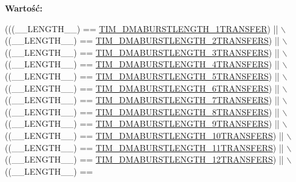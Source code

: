 {\bfseries Wartość\+:}
\begin{DoxyCode}
(((\_\_LENGTH\_\_) == \hyperlink{group___t_i_m___d_m_a___burst___length_ga74f07b4a10022d71f31ec6e1b2b69276}{TIM\_DMABURSTLENGTH\_1TRANSFER}) || \(\backslash\)
                                            ((\_\_LENGTH\_\_) == 
      \hyperlink{group___t_i_m___d_m_a___burst___length_gab114592091a00e0a6b9ae464485bd7bb}{TIM\_DMABURSTLENGTH\_2TRANSFERS}) || \(\backslash\)
                                            ((\_\_LENGTH\_\_) == 
      \hyperlink{group___t_i_m___d_m_a___burst___length_gad91c14f0930803593ecdbd98002fea0a}{TIM\_DMABURSTLENGTH\_3TRANSFERS}) || \(\backslash\)
                                            ((\_\_LENGTH\_\_) == 
      \hyperlink{group___t_i_m___d_m_a___burst___length_ga9ada9605ae6ff6e4ada9701263bef812}{TIM\_DMABURSTLENGTH\_4TRANSFERS}) || \(\backslash\)
                                            ((\_\_LENGTH\_\_) == 
      \hyperlink{group___t_i_m___d_m_a___burst___length_ga740a6446c0a517cc3e235fddee45fef5}{TIM\_DMABURSTLENGTH\_5TRANSFERS}) || \(\backslash\)
                                            ((\_\_LENGTH\_\_) == 
      \hyperlink{group___t_i_m___d_m_a___burst___length_ga905c206d2a028e3fb92bcab8f9f7c869}{TIM\_DMABURSTLENGTH\_6TRANSFERS}) || \(\backslash\)
                                            ((\_\_LENGTH\_\_) == 
      \hyperlink{group___t_i_m___d_m_a___burst___length_gae75055ac13b73baf9326f1d6157853a7}{TIM\_DMABURSTLENGTH\_7TRANSFERS}) || \(\backslash\)
                                            ((\_\_LENGTH\_\_) == 
      \hyperlink{group___t_i_m___d_m_a___burst___length_gac6b24f5b7d9e1968b4bfcaeb24e718fc}{TIM\_DMABURSTLENGTH\_8TRANSFERS}) || \(\backslash\)
                                            ((\_\_LENGTH\_\_) == 
      \hyperlink{group___t_i_m___d_m_a___burst___length_ga73fff75a3f0247c61a84a42e8cb83572}{TIM\_DMABURSTLENGTH\_9TRANSFERS}) || \(\backslash\)
                                            ((\_\_LENGTH\_\_) == 
      \hyperlink{group___t_i_m___d_m_a___burst___length_ga793a89bb8a0669e274de451985186c53}{TIM\_DMABURSTLENGTH\_10TRANSFERS}) || \(\backslash\)
                                            ((\_\_LENGTH\_\_) == 
      \hyperlink{group___t_i_m___d_m_a___burst___length_ga79ab58b6a3b30c54c0758b381df22cb0}{TIM\_DMABURSTLENGTH\_11TRANSFERS}) || \(\backslash\)
                                            ((\_\_LENGTH\_\_) == 
      \hyperlink{group___t_i_m___d_m_a___burst___length_gaf52962b501b3a76d89df6274ed425947}{TIM\_DMABURSTLENGTH\_12TRANSFERS}) || \(\backslash\)
                                            ((\_\_LENGTH\_\_) == 

\end{DoxyCode}
